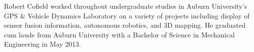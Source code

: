 Robert Cofield worked throughout undergraduate studies in Auburn University's GPS \& Vehicle Dynamics Laboratory on a variety of projects including display of sensor fusion information, autonomous robotics, and 3D mapping. He graduated cum laude from Auburn University with a Bachelor of Science in Mechanical Engineering in May 2013.